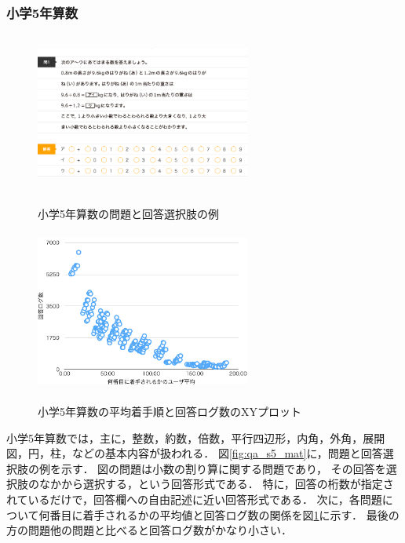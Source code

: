 \subsubsection{小学5年算数}
\begin{figure}[ht]
\begin{center}
	\includegraphics[width=200pt, height=150pt]{./img/qa_s5_mat2.png}
	\caption{小学5年算数の問題と回答選択肢の例}
	\label{fig:qa_s5_mat}
\endminipage\hfill
{}
	\includegraphics[width=200pt, height=150pt]{./img/stats_s5_mat.pdf}
	\caption{小学5年算数の平均着手順と回答ログ数のXYプロット}
	\label{fig:stats_s5_mat}
\endminipage\hfill
\end{center}
\end{figure}
小学5年算数では，主に，整数，約数，倍数，平行四辺形，内角，外角，展開図，円，柱，などの基本内容が扱われる．
図\ref{fig:qa_s5_mat}に，問題と回答選択肢の例を示す．
図の問題は小数の割り算に関する問題であり，
その回答を選択肢のなかから選択する，という回答形式である．
特に，回答の桁数が指定されているだけで，回答欄への自由記述に近い回答形式である．
次に，各問題について何番目に着手されるかの平均値と回答ログ数の関係を図\ref{fig:stats_s5_mat}に示す．
最後の方の問題他の問題と比べると回答ログ数がかなり小さい．


